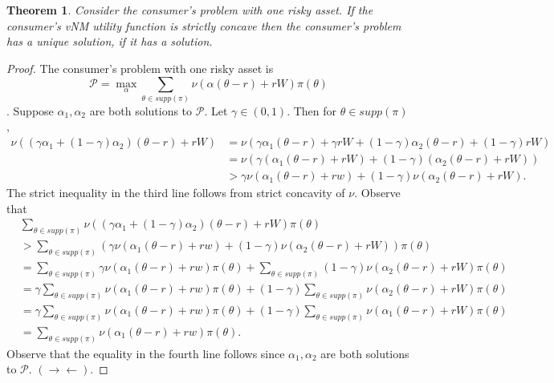 \documentclass[12pt]{article}
\newtheorem{thm}{Theorem}[section]
\theoremstyle{definition}
\theoremstyle{remark}
\def\contra{\rightarrow \leftarrow}
\begin{document}
\section{}
\begin{thm}
  Consider the consumer's problem with one risky asset. If the consumer's vNM utility function is strictly concave then the consumer's problem has a unique solution, if it has a solution.
\end{thm}
\begin{proof}
  The consumer's problem with one risky asset is $$\mathcal{P} = \max_\alpha \sum_{\theta \in supp(\pi)} \nu(\alpha(\theta - r) + rW)\pi(\theta)$$.
  Suppose $\alpha_1, \alpha_2$ are both solutions to $\mathcal{P}$. Let $\gamma \in (0,1)$. Then for $\theta \in supp(\pi)$,
  \begin{align*}
    \nu((\gamma \alpha_1 + (1 - \gamma)\alpha_2)(\theta - r) + rW) &= \nu(\gamma \alpha_1(\theta - r) + \gamma rW + (1 - \gamma)\alpha_2(\theta - r) + (1 - \gamma)rW) \\
    &= \nu(\gamma(\alpha_1(\theta - r) + rW) + (1 - \gamma)(\alpha_2(\theta - r) + rW)) \\
    &> \gamma \nu(\alpha_1(\theta - r) + rw) + (1 - \gamma)\nu(\alpha_2(\theta - r) + rW).
  \end{align*}
  The strict inequality in the third line follows from strict concavity of $\nu$. Observe that
  \begin{align*}
    & \sum_{\theta \in supp(\pi)} \nu((\gamma \alpha_1 + (1 - \gamma)\alpha_2)(\theta - r) + rW)\pi(\theta) \\
    &> \sum_{\theta \in supp(\pi)} (\gamma \nu(\alpha_1(\theta - r) + rw) + (1 - \gamma)\nu(\alpha_2(\theta - r) + rW)) \pi(\theta) \\
    &= \sum_{\theta \in supp(\pi)} \gamma \nu(\alpha_1(\theta - r) + rw)\pi(\theta) + \sum_{\theta \in supp(\pi)} (1 - \gamma)\nu(\alpha_2(\theta - r) + rW)\pi(\theta) \\
    &= \gamma \sum_{\theta \in supp(\pi)} \nu(\alpha_1(\theta - r) + rw)\pi(\theta) + (1 - \gamma)\sum_{\theta \in supp(\pi)} \nu(\alpha_2(\theta - r) + rW)\pi(\theta) \\
    &= \gamma \sum_{\theta \in supp(\pi)} \nu(\alpha_1(\theta - r) + rw)\pi(\theta) + (1 - \gamma)\sum_{\theta \in supp(\pi)} \nu(\alpha_1(\theta - r) + rW)\pi(\theta) \\
    &= \sum_{\theta \in supp(\pi)} \nu(\alpha_1(\theta - r) + rw)\pi(\theta).
  \end{align*}
  Observe that the equality in the fourth line follows since $\alpha_1, \alpha_2$ are both solutions to $\mathcal{P}$. $(\contra)$.
\end{proof}
%
%
\end{document}
